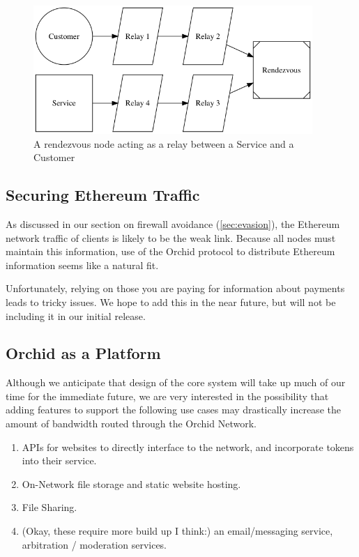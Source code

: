 \documentclass{article}
\newcommand{\orchid}{Orchid}
\newcommand{\Orchid}{\orchid}
\begin{document}
\begin{figure}[htbp]
  \centering
  \includegraphics[width = 300pt]{sttRttc}
  \caption{A rendezvous node acting as a relay between a Service and a Customer}
\end{figure}

\subsection{Securing Ethereum Traffic}
\label{securing-eth}

As discussed in our section on firewall avoidance (\ref{sec:evasion}),
the Ethereum network traffic of clients is likely to be the weak
link. Because all nodes must maintain this information, use of the
\Orchid{} protocol to distribute Ethereum information seems like a
natural fit.

Unfortunately, relying on those you are paying for information about
payments leads to tricky issues. We hope to add this in the near
future, but will not be including it in our initial release.

\subsection{\Orchid{} as a Platform}

Although we anticipate that design of the core system will take up
much of our time for the immediate future, we are very interested in
the possibility that adding features to support the following use
cases may drastically increase the amount of bandwidth routed through
the \Orchid{} Network.

\begin{enumerate}
\item APIs for websites to directly interface to the network, and
  incorporate tokens into their service.
\item On-Network file storage and static website hosting.
\item File Sharing.
\item (Okay, these require more build up I think:) an email/messaging
  service, arbitration / moderation services.
\end{enumerate}


\printbibliography
\end{document}
